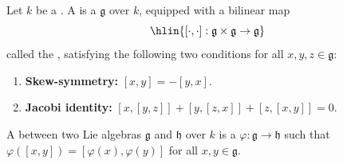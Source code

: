 \begin{definition} \label{definition:lie_algebra_over_a_field}

    Let $k$ be a . A  is a  $\mathfrak{g}$ over $k$, equipped with a bilinear map
    $$\hlin{[\cdot, \cdot] : \mathfrak{g} \times \mathfrak{g} \to \mathfrak{g}}$$
    called the , satisfying the following two conditions for all $x, y, z \in \mathfrak{g}$:

    \begin{enumerate}
        \item \textbf{Skew-symmetry:} $[x, y] = -[y, x]$.
        \item \textbf{Jacobi identity:} $[x, [y, z]] + [y, [z, x]] + [z, [x, y]] = 0$.
    \end{enumerate}

    A  between two Lie algebras $\mathfrak{g}$ and $\mathfrak{h}$ over $k$ is a  $\varphi : \mathfrak{g} \to \mathfrak{h}$ such that $\varphi([x, y]) = [\varphi(x), \varphi(y)]$ for all $x, y \in \mathfrak{g}$.
\end{definition}
